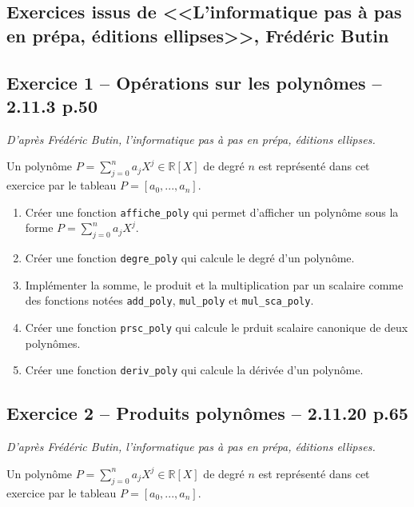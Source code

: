 \documentclass[10pt,fleqn]{article} %
\begin{document}
\newpage 


\begin{multicols}{2}

\section{Exercices issus de <<L'informatique pas à pas en prépa, éditions ellipses>>, Frédéric Butin}

\subsection*{Exercice 1 -- Opérations sur les polynômes -- 2.11.3 p.50}
\begin{flushright}
\textit{D'après Frédéric Butin, l'informatique pas à pas en prépa, éditions ellipses.}
\end{flushright}
Un polynôme $P=\sum\limits_{j=0}^{n}a_j X^j \in \mathbb{R}[X]$ de degré $n$ est représenté dans cet exercice par le tableau $P=[a_0,...,a_n]$.

\begin{enumerate}
\item Créer une fonction \texttt{affiche\_poly} qui permet d'afficher un polynôme sous la forme $P=\sum\limits_{j=0}^{n}a_j X^j$.
\item Créer une fonction \texttt{degre\_poly} qui calcule le degré d'un polynôme.
\item Implémenter la somme, le produit et la multiplication par un scalaire comme des fonctions notées \texttt{add\_poly}, \texttt{mul\_poly} et \texttt{mul\_sca\_poly}.
\item Créer une fonction \texttt{prsc\_poly} qui calcule le prduit scalaire canonique de deux polynômes.
\item Créer une fonction \texttt{deriv\_poly} qui calcule la dérivée d'un polynôme.
\end{enumerate}

\subsection*{Exercice 2 -- Produits polynômes -- 2.11.20 p.65}
\begin{flushright}
\textit{D'après Frédéric Butin, l'informatique pas à pas en prépa, éditions ellipses.}
\end{flushright}
Un polynôme $P=\sum\limits_{j=0}^{n}a_j X^j \in \mathbb{R}[X]$ de degré $n$ est représenté dans cet exercice par le tableau $P=[a_0,...,a_n]$.


\end{multicols}
\end{document}
